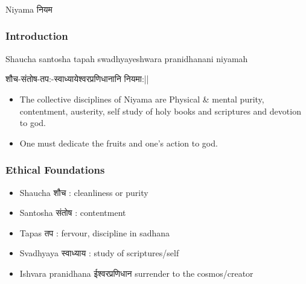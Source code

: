 \begin{frame}[fragile]\frametitle{}
\begin{center}
{\Large Niyama नियम}
\end{center}
\end{frame}


\begin{frame}[fragile]\frametitle{Introduction}

Shaucha santosha tapah swadhyayeshwara pranidhanani niyamah

शौच-संतोष-तप:-स्वाध्यायेश्वरप्रणिधानानि नियमा:||

	\begin{itemize}
	\item The  collective  disciplines  of 
Niyama  are  Physical  \&  mental 
purity, contentment, austerity,
self  study  of  holy  books  and 
scriptures and devotion to god. 
\item One  must  dedicate  the  fruits 
and one’s action to god.
	\end{itemize}

\end{frame}

\begin{frame}[fragile]\frametitle{Ethical Foundations}

	\begin{itemize}
	\item Shaucha शौच : cleanliness or purity
	\item Santosha संतोष : contentment
	\item Tapas तप : fervour, discipline in sadhana
	\item Svadhyaya स्वाध्याय : study of scriptures/self
	\item Ishvara pranidhana ईश्वरप्रणिधान surrender to the cosmos/creator
	\end{itemize}

\end{frame}


